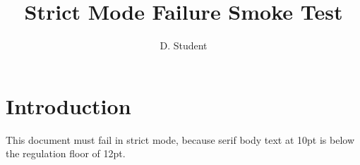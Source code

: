 \documentclass[phd,font=termes,10pt,a4paper]{bangor}
\title{Strict Mode Failure Smoke Test}
\author{D. Student}
\begin{document}
\maketitle
\chapter{Introduction}
This document must fail in strict mode, because serif body text at
10pt is below the regulation floor of 12pt.
\end{document}
